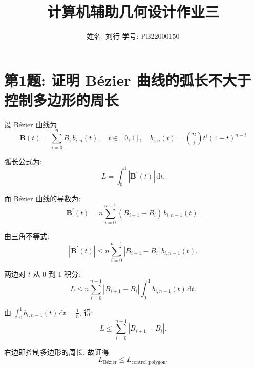 \documentclass{article}
\begin{document}
    \title{计算机辅助几何设计作业三}
    \author{姓名: 刘行 \quad 学号: PB22000150}
    \date{}
    \maketitle

    \section*{第1题: 证明 Bézier 曲线的弧长不大于控制多边形的周长}
        设 Bézier 曲线为
        \begin{equation*}
            \mathbf{B}\left(t\right) = \sum_{i=0}^{n} B_{i} \, b_{i,n}\left(t\right), \quad t \in [0,1], \quad b_{i,n}\left(t\right) = \binom{n}{i} t^{i} (1-t)^{n-i}
        \end{equation*}

        弧长公式为:
        \begin{equation*}
            L = \int_{0}^{1} \left\lvert\mathbf{B}^{\prime}(t)\right\rvert \, \text{d}t.
        \end{equation*}

        而 Bézier 曲线的导数为:
        \begin{equation*}
            \mathbf{B}^{\prime}(t) = n \sum_{i=0}^{n-1} (B_{i+1} - B_{i}) \, b_{i,n-1}\left(t\right).
        \end{equation*}

        由三角不等式:
        \begin{equation*}
            \left\lvert\mathbf{B}^{\prime}\left(t\right)\right\rvert \leq n \sum_{i=0}^{n-1} \left\lvert B_{i+1}-B_{i}\right\rvert \, b_{i,n-1}\left(t\right).
        \end{equation*}

        两边对 $t$ 从 0 到 1 积分:
        \begin{equation*}
            L \leq n \sum_{i=0}^{n-1} \left\lvert B_{i+1}-B_{i}\right\rvert \int_{0}^{1} b_{i,n-1}\left(t\right) \, \text{d}t.
        \end{equation*}

        由 $\int_{0}^{1} b_{i,n-1}\left(t\right) \, \text{d}t = \frac{1}{n}$, 得:
        \begin{equation*}
            L \leq \sum_{i=0}^{n-1} \left\lvert B_{i+1}-B_{i}\right\rvert.
        \end{equation*}

        右边即控制多边形的周长, 故证得:
        \begin{equation*}
            L_{\text{Bézier}} \leq L_{\text{control polygon}}.
        \end{equation*}
\end{document}

